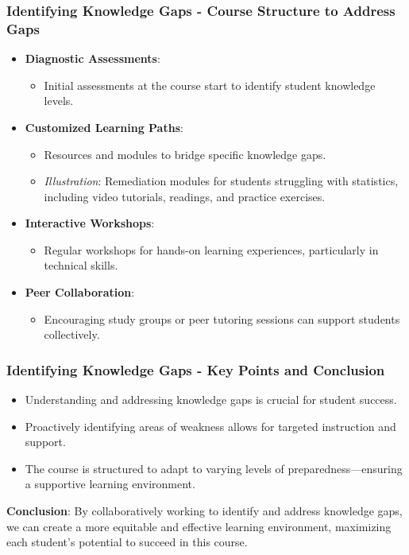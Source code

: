 \documentclass[aspectratio=169]{beamer}
\begin{document}
\begin{frame}[fragile]
  \frametitle{Identifying Knowledge Gaps - Course Structure to Address Gaps}
  \begin{itemize}
    \item \textbf{Diagnostic Assessments}: 
      \begin{itemize}
        \item Initial assessments at the course start to identify student knowledge levels.
      \end{itemize}
    
    \item \textbf{Customized Learning Paths}: 
      \begin{itemize}
        \item Resources and modules to bridge specific knowledge gaps.
        \item \textit{Illustration}: Remediation modules for students struggling with statistics, including video tutorials, readings, and practice exercises.
      \end{itemize}

    \item \textbf{Interactive Workshops}: 
      \begin{itemize}
        \item Regular workshops for hands-on learning experiences, particularly in technical skills.
      \end{itemize}

    \item \textbf{Peer Collaboration}: 
      \begin{itemize}
        \item Encouraging study groups or peer tutoring sessions can support students collectively.
      \end{itemize}
  \end{itemize}
\end{frame}

\begin{frame}[fragile]
  \frametitle{Identifying Knowledge Gaps - Key Points and Conclusion}
  \begin{itemize}
    \item Understanding and addressing knowledge gaps is crucial for student success.
    \item Proactively identifying areas of weakness allows for targeted instruction and support.
    \item The course is structured to adapt to varying levels of preparedness—ensuring a supportive learning environment.
  \end{itemize}
  
  \textbf{Conclusion}: By collaboratively working to identify and address knowledge gaps, we can create a more equitable and effective learning environment, maximizing each student's potential to succeed in this course.
\end{frame}
\end{document}
